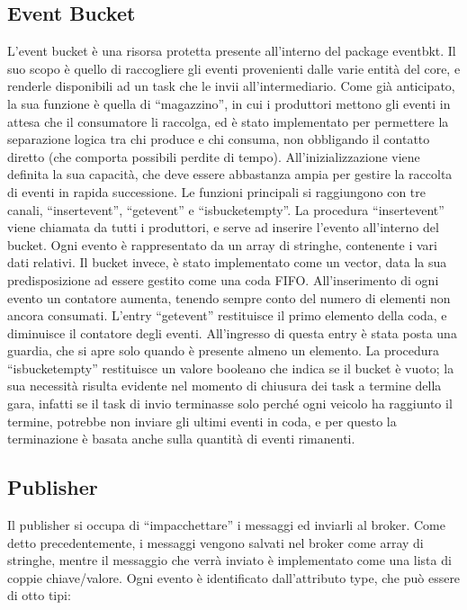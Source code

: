 \subsection{Event Bucket}

L’event bucket è una risorsa protetta presente all’interno del package event\textunderscore bkt. Il suo scopo è quello di raccogliere gli eventi provenienti dalle varie entità del core, e renderle disponibili ad un task che le invii all’intermediario.
Come già anticipato, la sua funzione è quella di “magazzino”, in cui i produttori mettono gli eventi in attesa che il consumatore li raccolga, ed è stato implementato per permettere la separazione logica tra chi produce e chi consuma, non obbligando il contatto diretto (che comporta possibili perdite di tempo).
All’inizializzazione viene definita la sua capacità, che deve essere abbastanza ampia per gestire la raccolta di eventi in rapida successione.
Le funzioni principali si raggiungono con tre canali, “insert\textunderscore event”, “get\textunderscore event” e “is\textunderscore bucket\textunderscore empty”.
La procedura “insert\textunderscore event” viene chiamata da tutti i produttori, e serve ad inserire l’evento all’interno del bucket. Ogni evento è rappresentato da un array di stringhe, contenente i vari dati relativi. Il bucket invece, è stato implementato come un vector, data la sua predisposizione ad essere gestito come una coda FIFO. All’inserimento di ogni evento un contatore aumenta, tenendo sempre conto del numero di elementi non ancora consumati.
L’entry “get\textunderscore event” restituisce il primo elemento della coda, e diminuisce il contatore degli eventi. All’ingresso di questa entry è stata posta una guardia, che si apre solo quando è presente almeno un elemento.
La procedura “is\textunderscore bucket\textunderscore empty” restituisce un valore booleano che indica se il bucket è vuoto; la sua necessità risulta evidente nel momento di chiusura dei task a termine della gara, infatti se il task di invio terminasse solo perché ogni veicolo ha raggiunto il termine, potrebbe non inviare gli ultimi eventi in coda, e per questo la terminazione è basata anche sulla quantità di eventi rimanenti.

\subsection{Publisher}

Il publisher si occupa di “impacchettare” i messaggi ed inviarli al broker. Come detto precedentemente, i messaggi vengono salvati nel broker come array di stringhe, mentre il messaggio che verrà inviato è implementato come una lista di coppie chiave/valore.
Ogni evento è identificato dall’attributo type, che può essere di otto tipi:

